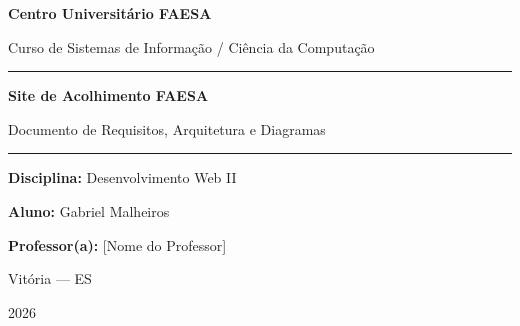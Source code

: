 \documentclass[12pt, a4paper]{article}
\begin{document}
\begin{titlepage}
\begin{center}

\vspace*{1cm}


\vspace{1.5cm}

{\LARGE\textcolor{faesaAzul}{\textbf{Centro Universitário FAESA}}}

\vspace{0.5cm}

{\large\textcolor{faesaCinza}{Curso de Sistemas de Informação / Ciência da Computação}}

\vspace{2cm}

\rule{\textwidth}{2pt}

\vspace{0.5cm}

{\Huge\textcolor{faesaAzul}{\textbf{Site de Acolhimento FAESA}}}

\vspace{0.3cm}

{\Large\textcolor{faesaAzulClaro}{Documento de Requisitos, Arquitetura e Diagramas}}

\vspace{0.5cm}

\rule{\textwidth}{2pt}

\vspace{2.5cm}

{\large\textbf{Disciplina:} Desenvolvimento Web II}

\vspace{0.3cm}

{\large\textbf{Aluno:} Gabriel Malheiros}

\vspace{0.3cm}

{\large\textbf{Professor(a):} [Nome do Professor]}

\vspace{\fill}

{\large Vitória --- ES}

{\large 2026}

\end{center}
\end{titlepage}
\end{document}
